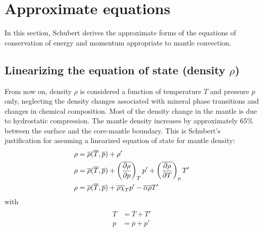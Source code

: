 \documentclass[document.tex]{subfiles}
\begin{document}
\section{\cite{scto01} Approximate equations}
In this section, Schubert derives the approximate forms of the equations of conservation
of energy and momentum appropriate to mantle convection. 

\subsection{Linearizing the equation of state (density $\rho$)}
From now on, density $\rho$ is considered a function of temperature $T$ and pressure $p$ only, neglecting the 
density changes associated with mineral phase transitions and changes in chemical composition. 
\newline
Most of the density change in the mantle is due to hydrostatic compression. The mantle density increases by approximately 
65\% between the surface and the core-mantle boundary. This is Schubert's justification for assuming a linearized equation of 
state for mantle density: 
\begin{align}
    \begin{split}
    \label{eq:6.10.1}
    \rho &= \overline{\rho}(\overline{T}, \overline{p}) + \rho ' \\
    \rho &= \overline{\rho}(\overline{T}, \overline{p}) + \left( \overline{\pdv{\rho}{p}}\right)_T p' +
     \left( \overline{\pdv{\rho}{T}} \right)_p T'\\
    \rho &= \overline{\rho}(\overline{T}, \overline{p}) + \overline{\rho \chi}_T p' -\overline{\alpha\rho}T'\\
\end{split}
\end{align}
with 
\begin{align}
    \begin{split}
    T &= \overline{T} + T'\\
    p &= \overline{p} +p' \\
    \end{split}
\end{align}
\end{document}

